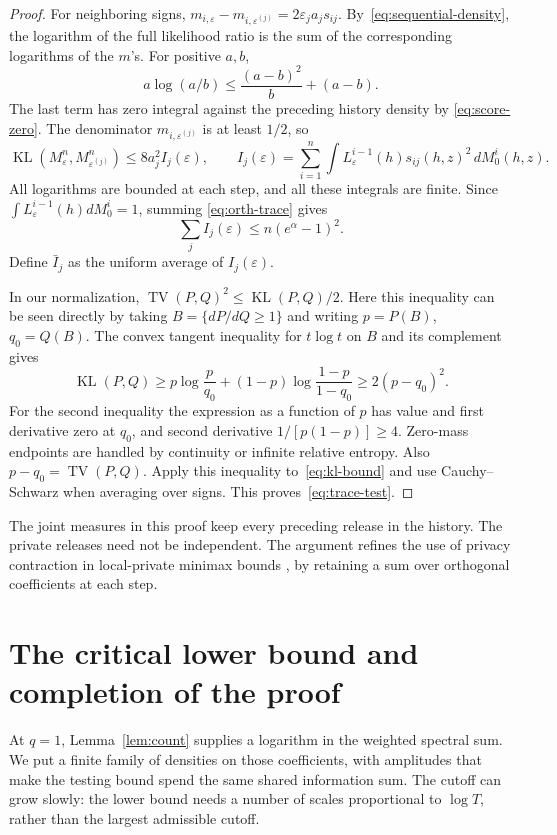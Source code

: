\documentclass[11pt]{article}
\newcommand{\TV}{\operatorname{TV}}
\newcommand{\KL}{\operatorname{KL}}
\begin{document}
\begin{proof}
For neighboring signs,
$m_{i,\varepsilon}-m_{i,\varepsilon^{(j)}}
=2\varepsilon_j a_j s_{ij}$. By~\eqref{eq:sequential-density}, the logarithm
of the full likelihood ratio is the sum of the corresponding logarithms of
the $m$'s. For positive $a,b$,
\[
 a\log(a/b)\le\frac{(a-b)^2}{b}+(a-b).
\]
The last term has zero integral against the preceding history density by
\eqref{eq:score-zero}. The denominator $m_{i,\varepsilon^{(j)}}$ is at
least $1/2$, so
\begin{equation}\label{eq:kl-bound}
 \KL(M_\varepsilon^n,M_{\varepsilon^{(j)}}^n)
 \le8a_j^2 I_j(\varepsilon),\qquad
 I_j(\varepsilon)=\sum_{i=1}^n\int
 L_\varepsilon^{i-1}(h)s_{ij}(h,z)^2\,dM_0^i(h,z).
\end{equation}
All logarithms are bounded at each step, and all these integrals are finite.
Since $\int L_\varepsilon^{i-1}(h)dM_0^i=1$, summing
\eqref{eq:orth-trace} gives
\[
 \sum_jI_j(\varepsilon)\le n(e^\alpha-1)^2.
\]
Define $\bar I_j$ as the uniform average of $I_j(\varepsilon)$.

In our normalization, $\TV(P,Q)^2\le\KL(P,Q)/2$.
Here this inequality can be seen directly by taking
$B=\{dP/dQ\ge1\}$ and writing $p=P(B)$, $q_0=Q(B)$.
The convex tangent inequality for $t\log t$ on $B$ and its complement gives
\[
 \KL(P,Q)\ge p\log\frac p{q_0}
 +(1-p)\log\frac{1-p}{1-q_0}\ge2(p-q_0)^2.
\]
For the second inequality the expression as a function of $p$ has value and
first derivative zero at $q_0$, and second derivative
$1/[p(1-p)]\ge4$. Zero-mass endpoints are handled by continuity or infinite
relative entropy. Also $p-q_0=\TV(P,Q)$.
Apply this inequality to~\eqref{eq:kl-bound} and use Cauchy--Schwarz when
averaging over signs. This proves~\eqref{eq:trace-test}.
\end{proof}

The joint measures in this proof keep every preceding release in the
history. The private releases need not be independent. The argument refines
the use of privacy contraction in local-private minimax bounds
\cite{DJW}, by retaining a sum over orthogonal coefficients at each step.

\section{The critical lower bound and completion of the proof}

At $q=1$, Lemma~\ref{lem:count} supplies a logarithm in the weighted spectral
sum. We put a finite family of densities on those coefficients, with
amplitudes that make the testing bound spend the same shared information sum.
The cutoff can grow slowly: the lower bound needs a number of scales
proportional to $\log T$, rather than the largest admissible cutoff.
\end{document}
